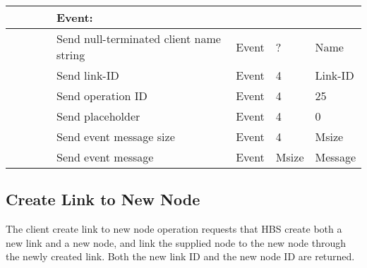 \begin{tabular}{|p{1.2in}|p{.4in}|p{.4in}|p{.5in}|p{1.2in}|p{.4in}|p{.4in}|p{.5in} |}
\multicolumn{4}{|l}{~}&\multicolumn{4}{|l|}{{\bf Event:}} \\ \hline
                  &        &       &       & Send null-terminated client
                                             name string  & Event  &  ?    & Name  \\ \hline
                  &        &       &       & Send link-ID  & Event  &   4   &   Link-ID    \\  \hline
                  &        &       &       & Send operation 
                                             ID           & Event  &   4   &  25   \\ \hline
                  &        &       &       & Send placeholder    & Event  &   4   &  0    \\ \hline
                  &        &       &       & Send event message
                                                  size    & Event  &   4   &  Msize \\ \hline
                  &        &       &       & Send event message
                                                          & Event  & Msize & Message  \\ \hline
\end{tabular}
\normalsize
\bigskip



\newpage
\subsection{Create Link to New Node}

The client create link to new node operation requests that HBS create both a new
link and a new node, and link the supplied node to the new node through the
newly created link.  Both the new link ID and the new node ID are returned. 


